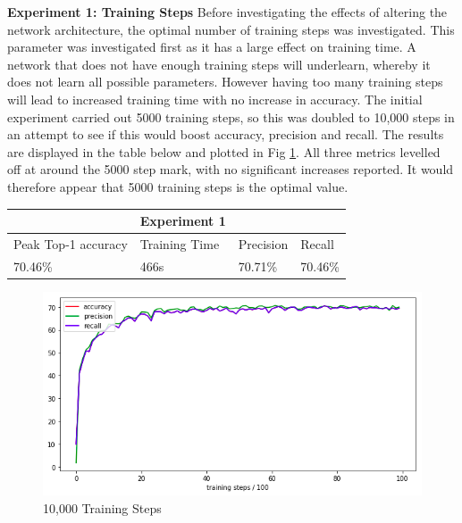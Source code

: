 \documentclass[12pt]{report}
\begin{document}
\begin{flushleft}
\vspace{0.5cm}
\textbf{Experiment 1: Training Steps}
\linebreak
Before investigating the effects of altering the network architecture, the optimal number of training steps was investigated. This parameter was investigated first as it has a large effect on training time. A network that does not have enough training steps will underlearn, whereby it does not learn all possible parameters. However having too many training steps will lead to increased training time with no increase in accuracy. The initial experiment carried out 5000 training steps, so this was doubled to 10,000 steps in an attempt to see if this would boost accuracy, precision and recall. The results are displayed in the table below and plotted in Fig \ref{fig:experiment-1}. All three metrics levelled off at around the 5000 step mark, with no significant increases reported. It would therefore appear that 5000 training steps is the optimal value.

\vspace{0.5cm}
\begin{tabular}{llll}
                                           & Experiment 1                       &                                                             \\ \hline
\multicolumn{1}{|l|}{Peak Top-1 accuracy} & \multicolumn{1}{l|}{Training Time} & \multicolumn{1}{l|}{Precision} & \multicolumn{1}{l|}{Recall}  \\ \hline
\multicolumn{1}{|l|}{70.46\%}             & \multicolumn{1}{l|}{466s}          & \multicolumn{1}{l|}{70.71\%}   & \multicolumn{1}{l|}{70.46\%} \\ \hline
\end{tabular}

\vspace{0.5cm}
\begin{figure}[h]
	\centering
	\includegraphics[width=12cm]{experiment-1}
	\caption{10,000 Training Steps}
	\label{fig:experiment-1}
\end{figure}
\end{flushleft}
\end{document}
